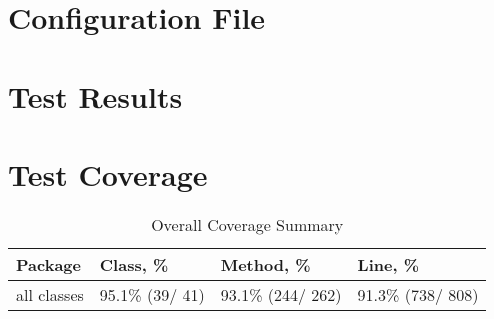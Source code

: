 






\appendix

\chapter{Configuration File}
	
\chapter{Test Results}
	
\chapter{Test Coverage}
	
	\begin{table}[!htp]
		\caption{Overall Coverage Summary}
		\centering
		\begin{tabular}{|l|l|l|l|}
			\hline	
			\textbf{Package}	&\textbf{Class, \%}	&\textbf{Method, \%}	&\textbf{Line, \%} \\ \hline
			all classes	&95.1\% (39/ 41)	&93.1\% (244/ 262)&	91.3\% (738/ 808) \\ \hline
		\end{tabular}
	\end{table}


